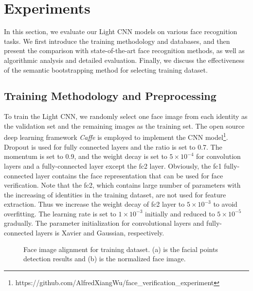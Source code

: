 \documentclass[journal,transmag]{IEEEtran}
\begin{document}
\section{Experiments}

In this section, we evaluate our Light CNN models on various face recognition tasks. We first introduce the training methodology and databases, and then present the comparison with state-of-the-art face recognition methods, as well as algorithmic analysis and detailed evaluation. Finally, we discuss the effectiveness of the semantic bootstrapping method for selecting training dataset.

\subsection{Training Methodology and Preprocessing}\label{41}

To train the Light CNN, we randomly select one face image from each identity as the validation set and the remaining images as the training set. The open source deep learning framework \textit{Caffe} \cite{jia2014caffe} is employed to implement the CNN model\footnote{https://github.com/AlfredXiangWu/face\_verification\_experiment}.
Dropout is used for fully connected layers and the ratio is set to 0.7.
The momentum is set to 0.9, and the weight decay is set to $5\times10^{-4}$ for convolution layers and a fully-connected layer except the fc2 layer. Obviously, the fc1 fully-connected layer contains the face representation that can be used for face verification. Note that the fc2, which contains large number of parameters with the increasing of identities in the training dataset, are not used for feature extraction.
Thus we increase the weight decay of fc2 layer to $5\times10^{-3}$ to avoid overfitting.
The learning rate is set to $1\times10^{-3}$ initially and reduced to $5\times10^{-5}$ gradually. The parameter initialization for convolutional layers and fully-connected layers is Xavier and Gaussian, respectively.

\begin{figure}[t]
\centering
{}
\caption{Face image alignment for training dataset. (a) is the facial points detection results and (b) is the normalized face image.}
\label{fig:normal}
\end{figure}
\end{document}
